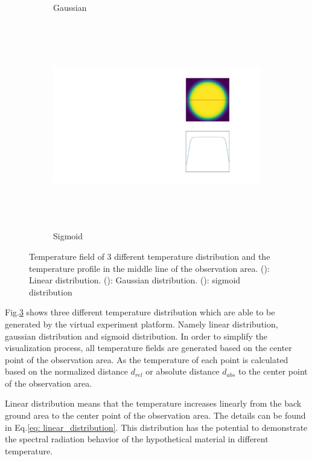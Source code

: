 \begin{figure}[htbp]
\begin{subfigure}{0.3\textwidth}
        \caption{Gaussian}
        \label{fig: gaussian_distribution}        
    \end{subfigure}
    \begin{subfigure}{0.3\textwidth}
        \centering
        \includegraphics[height=9cm]{figures/temp_distribution_c_1.pdf}
        \caption{Sigmoid}
        \label{fig: sigmoid_distribution}        
    \end{subfigure}
    \caption{Temperature field of 3 different temperature distribution and the 
    temperature profile in the middle line of the observation area. (): 
    Linear distribution. (): Gaussian distribution. 
    (): sigmoid distribution}
    \label{fig: temperature_profile}
\end{figure}


Fig.\ref{fig: temperature_profile} shows three different temperature distribution 
which are able to be generated by the virtual experiment platform. Namely linear 
distribution, gaussian distribution and sigmoid distribution. In order to simplify 
the visualization process, all temperature fields are generated based on the center 
point of the observation area. As the temperature of each point is calculated 
based on the normalized distance $d_{rel}$ or absolute distance ${d_{abs}}$ to the center point of the observation area.


Linear distribution means that the temperature increases linearly from the back ground 
area to the center point of the observation area. The details can be found in 
Eq.\ref{eq: linear_distribution}. This distribution has the potential to 
demonstrate the spectral radiation behavior of the hypothetical material in 
different temperature. 


